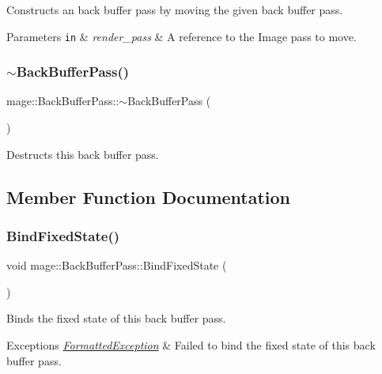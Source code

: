 Constructs an back buffer pass by moving the given back buffer pass.


\begin{DoxyParams}[1]{Parameters}
\mbox{\tt in}  & {\em render\+\_\+pass} & A reference to the Image pass to move. \\
\hline
\end{DoxyParams}
\hypertarget{classmage_1_1_back_buffer_pass_a10ccd92ff4480261e9ecfc435f5d9ed3}{}\label{classmage_1_1_back_buffer_pass_a10ccd92ff4480261e9ecfc435f5d9ed3} 
\subsubsection{\texorpdfstring{$\sim$\+Back\+Buffer\+Pass()}{~BackBufferPass()}}
{\footnotesize\ttfamily mage\+::\+Back\+Buffer\+Pass\+::$\sim$\+Back\+Buffer\+Pass (\begin{DoxyParamCaption}{ }\end{DoxyParamCaption})\hspace{0.3cm}{\ttfamily [default]}}

Destructs this back buffer pass. 

\subsection{Member Function Documentation}
\hypertarget{classmage_1_1_back_buffer_pass_a86dd8df1ac3fac070d1373dad045c975}{}\label{classmage_1_1_back_buffer_pass_a86dd8df1ac3fac070d1373dad045c975} 
\subsubsection{\texorpdfstring{Bind\+Fixed\+State()}{BindFixedState()}}
{\footnotesize\ttfamily void mage\+::\+Back\+Buffer\+Pass\+::\+Bind\+Fixed\+State (\begin{DoxyParamCaption}{ }\end{DoxyParamCaption})}

Binds the fixed state of this back buffer pass.


\begin{DoxyExceptions}{Exceptions}
{\em \hyperlink{structmage_1_1_formatted_exception}{Formatted\+Exception}} & Failed to bind the fixed state of this back buffer pass. \\
\hline
\end{DoxyExceptions}
\hypertarget{classmage_1_1_back_buffer_pass_ae925b441c80f2aa711fbba6d782e5f81}{}\label{classmage_1_1_back_buffer_pass_ae925b441c80f2aa711fbba6d782e5f81} 
